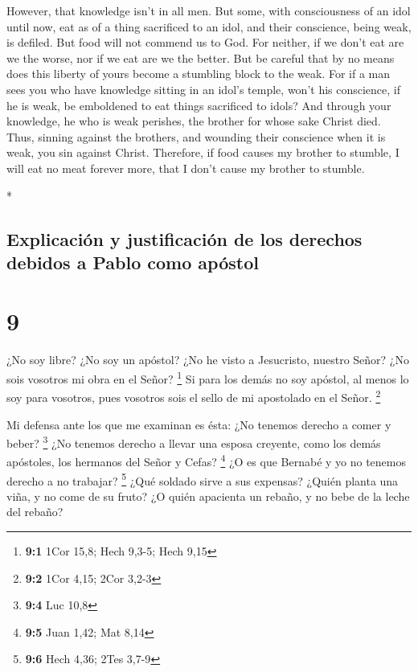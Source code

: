 \begin{paracol}{2}
\begin{otherlanguage}{english}
 However, that knowledge isn't in all men. But some, with
consciousness of an idol until now, eat as of a thing sacrificed to an
idol, and their conscience, being weak, is defiled.  But
food will not commend us to God. For neither, if we don't eat are we the
worse, nor if we eat are we the better.  But be careful
that by no means does this liberty of yours become a stumbling block to
the weak.  For if a man sees you who have knowledge
sitting in an idol's temple, won't his conscience, if he is weak, be
emboldened to eat things sacrificed to idols?  And
through your knowledge, he who is weak perishes, the brother for whose
sake Christ died.  Thus, sinning against the brothers,
and wounding their conscience when it is weak, you sin against Christ.
 Therefore, if food causes my brother to stumble, I will
eat no meat forever more, that I don't cause my brother to stumble.

\end{otherlanguage}

\switchcolumn[0]*

\hypertarget{explicaciuxf3n-y-justificaciuxf3n-de-los-derechos-debidos-a-pablo-como-apuxf3stol}{%
\subsection{Explicación y justificación de los derechos debidos a Pablo
como
apóstol}\label{explicaciuxf3n-y-justificaciuxf3n-de-los-derechos-debidos-a-pablo-como-apuxf3stol}}

\hypertarget{section-16}{%
\section{9}\label{section-16}}

 ¿No soy libre? ¿No soy un apóstol? ¿No he visto a
Jesucristo, nuestro Señor? ¿No sois vosotros mi obra en el Señor?
\footnote{\textbf{9:1} 1Cor 15,8; Hech 9,3-5; Hech 9,15} 
Si para los demás no soy apóstol, al menos lo soy para vosotros, pues
vosotros sois el sello de mi apostolado en el Señor. \footnote{\textbf{9:2}
  1Cor 4,15; 2Cor 3,2-3}

 Mi defensa ante los que me examinan es ésta:
 ¿No tenemos derecho a comer y beber? \footnote{\textbf{9:4}
  Luc 10,8}  ¿No tenemos derecho a llevar una esposa
creyente, como los demás apóstoles, los hermanos del Señor y Cefas?
\footnote{\textbf{9:5} Juan 1,42; Mat 8,14}  ¿O es que
Bernabé y yo no tenemos derecho a no trabajar? \footnote{\textbf{9:6}
  Hech 4,36; 2Tes 3,7-9}  ¿Qué soldado sirve a sus
expensas? ¿Quién planta una viña, y no come de su fruto? ¿O quién
apacienta un rebaño, y no bebe de la leche del rebaño?


\end{paracol}
